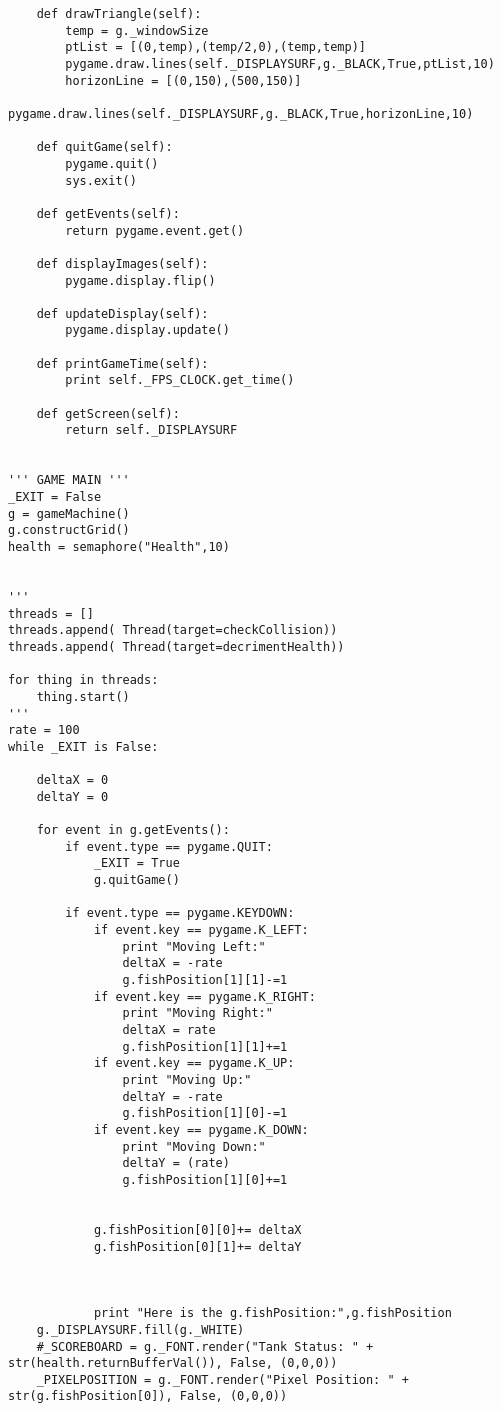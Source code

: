 \begin{verbatim}
    def drawTriangle(self):
        temp = g._windowSize
        ptList = [(0,temp),(temp/2,0),(temp,temp)]
        pygame.draw.lines(self._DISPLAYSURF,g._BLACK,True,ptList,10)
        horizonLine = [(0,150),(500,150)]
        pygame.draw.lines(self._DISPLAYSURF,g._BLACK,True,horizonLine,10)

    def quitGame(self):
        pygame.quit()
        sys.exit()
    
    def getEvents(self):
        return pygame.event.get()
    
    def displayImages(self):    
        pygame.display.flip()

    def updateDisplay(self):
        pygame.display.update()

    def printGameTime(self):
        print self._FPS_CLOCK.get_time()

    def getScreen(self):
        return self._DISPLAYSURF 


''' GAME MAIN '''
_EXIT = False
g = gameMachine()
g.constructGrid()
health = semaphore("Health",10)


'''
threads = []
threads.append( Thread(target=checkCollision))
threads.append( Thread(target=decrimentHealth))

for thing in threads:
    thing.start()
'''
rate = 100
while _EXIT is False:
    
    deltaX = 0
    deltaY = 0

    for event in g.getEvents():
        if event.type == pygame.QUIT:
            _EXIT = True
            g.quitGame()

        if event.type == pygame.KEYDOWN:
            if event.key == pygame.K_LEFT:
                print "Moving Left:"
                deltaX = -rate
                g.fishPosition[1][1]-=1
            if event.key == pygame.K_RIGHT:
                print "Moving Right:"
                deltaX = rate
                g.fishPosition[1][1]+=1
            if event.key == pygame.K_UP:
                print "Moving Up:"
                deltaY = -rate
                g.fishPosition[1][0]-=1
            if event.key == pygame.K_DOWN:
                print "Moving Down:"
                deltaY = (rate) 
                g.fishPosition[1][0]+=1
            

            g.fishPosition[0][0]+= deltaX
            g.fishPosition[0][1]+= deltaY

            

            print "Here is the g.fishPosition:",g.fishPosition
    g._DISPLAYSURF.fill(g._WHITE)
    #_SCOREBOARD = g._FONT.render("Tank Status: " + str(health.returnBufferVal()), False, (0,0,0))
    _PIXELPOSITION = g._FONT.render("Pixel Position: " + str(g.fishPosition[0]), False, (0,0,0))


\end{verbatim}
